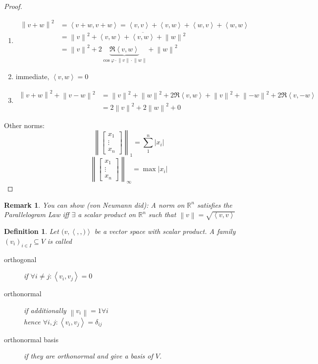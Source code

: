 \documentclass{article}
\newcounter{lecref}[section]
\numberwithin{lecref}{section}
\newtheorem{definition}[lecref]{Definition}
\newtheorem{remark}[lecref]{Remark}
\newcommand{\ip}[2]{\left\langle#1,#2\right\rangle} %
\newcommand{\norm}[1]{\left\|#1\right\|}
\newcommand{\card}[1]{\left|#1\right|}
\begin{document}
\begin{proof}
  \begin{enumerate}
    \item 
      \begin{align*}
        \norm{v + w}^2 &= \ip{v + w}{v + w} = \ip vv + \ip vw + \ip wv + \ip ww \\
          &= \norm{v}^2 + \ip vw + \overline{\ip vw} + \norm{w}^2 \\
          &= \norm{v}^2 + 2 \underbrace{\Re\ip vw}_{\cos\varphi \cdot \norm v \cdot \norm w} + \norm{w}^2
      \end{align*}
    \item immediate, $\ip vw = 0$
    \item
      \begin{align*}
        \norm{v + w}^2 + \norm{v - w}^2 &= {\norm v}^2 + \norm{w}^2 + 2 \Re\ip vw + \norm{v}^2 + \norm{-w}^2 + 2\Re\ip v{-w} \\
          &= 2 \norm{v}^2 + 2 \norm{w}^2 + 0
      \end{align*}
  \end{enumerate}
  Other norms:
  \[ \norm{\begin{bmatrix} x_1 \\ \vdots \\ x_n \end{bmatrix}}_1 = \sum_{1}^n \card{x_i} \]
  \[ \norm{\begin{bmatrix} x_1 \\ \vdots \\ x_n \end{bmatrix}}_\infty = \max \card{x_i} \]
\end{proof}

\begin{remark} %
  You can show (von Neumann did):
  A norm on $\mathbb R^n$ satisfies the Parallelogram Law
  iff $\exists$ a scalar product on $\mathbb R^n$ such that $\norm v = \sqrt{\ip vv}$
\end{remark}

\begin{definition} %
  Let $(v, \ip ,)$ be a vector space with scalar product.
  A family $(v_i)_{i \in I} \subseteq V$ is called
  \begin{description}
    \item[orthogonal] if $\forall i \neq j: \ip{v_i}{v_j} = 0$
    \item[orthonormal] if additionally $\norm{v_i} = 1 \forall i$ \\
      hence $\forall i,j: \ip{v_i}{v_j} = \delta_{ij}$
    \item[orthonormal basis] if they are orthonormal and give a basis of $V$.
  \end{description}
\end{definition}
\end{document}
